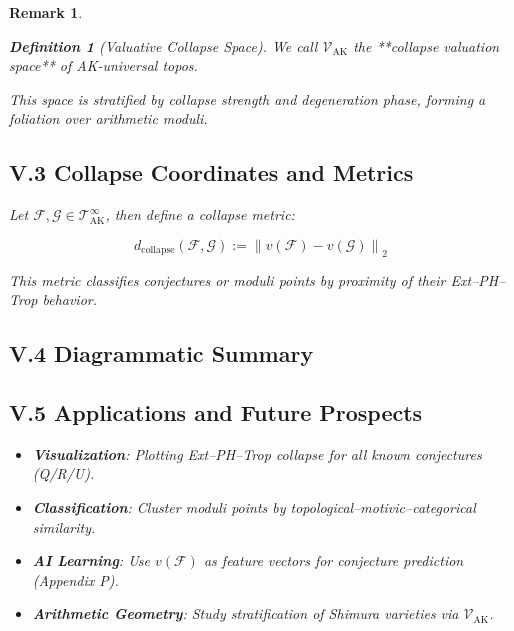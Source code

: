 \documentclass[11pt]{article}
\newtheorem{definition}[theorem]{Definition}
\newtheorem{remark}[theorem]{Remark}
\begin{document}
\begin{remark}
\begin{definition}[Valuative Collapse Space]
We call \( \mathscr{V}_{\mathrm{AK}} \) the **collapse valuation space** of AK-universal topos.
\end{definition}

This space is stratified by collapse strength and degeneration phase, forming a foliation over arithmetic moduli.

\subsection*{V.3 Collapse Coordinates and Metrics}

Let \( \mathcal{F}, \mathcal{G} \in \mathscr{T}_{\mathrm{AK}}^{\infty} \), then define a collapse metric:

\[
d_{\mathrm{collapse}}(\mathcal{F}, \mathcal{G}) := 
\left\| v(\mathcal{F}) - v(\mathcal{G}) \right\|_2
\]

This metric classifies conjectures or moduli points by proximity of their Ext–PH–Trop behavior.

\subsection*{V.4 Diagrammatic Summary}

\vspace{1em}
\begin{center}
\end{center}
\vspace{1em}

\subsection*{V.5 Applications and Future Prospects}

\begin{itemize}
  \item \textbf{Visualization}: Plotting Ext–PH–Trop collapse for all known conjectures (Q/R/U).
  \item \textbf{Classification}: Cluster moduli points by topological–motivic–categorical similarity.
  \item \textbf{AI Learning}: Use \( v(\mathcal{F}) \) as feature vectors for conjecture prediction (Appendix P).
  \item \textbf{Arithmetic Geometry}: Study stratification of Shimura varieties via \( \mathscr{V}_{\mathrm{AK}} \).
\end{itemize}


\end{remark}
\end{document}
